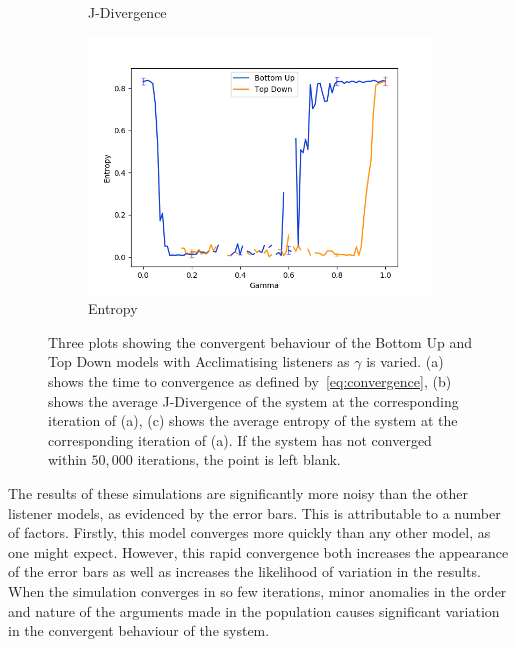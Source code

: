 \begin{figure}[H]
\begin{subfigure}[ht]{0.45\textwidth}
    \caption{J-Divergence}
 \end{subfigure}
 \hfill
 \begin{subfigure}[ht]{0.45\textwidth}
    \includegraphics[width=\textwidth]{Images/Figures/ListenerModelPlots/Ageing/AgeingEntropyDONTDELETE(copy).png}
    \caption{Entropy}
 \end{subfigure}
 \caption{Three plots showing the convergent behaviour of the Bottom Up and Top Down models with Acclimatising listeners as $\gamma$ is varied. (a) shows the time to convergence as defined by~\cref{eq:convergence}, (b) shows the average J-Divergence of the system at the corresponding iteration of (a), (c) shows the average entropy of the system at the corresponding iteration of (a). If the system has not converged within $50,000$ iterations, the point is left blank.}\label{fig:convergence_Ageing}
\end{figure}


The results of these simulations are significantly more noisy than the other listener models, as evidenced by the error bars. This is attributable to a number of factors. Firstly, this model converges more quickly than any other model, as one might expect. However, this rapid convergence both increases the appearance of the error bars as well as increases the likelihood of variation in the results. When the simulation converges in so few iterations, minor anomalies in the order and nature of the arguments made in the population causes significant variation in the convergent behaviour of the system. 


